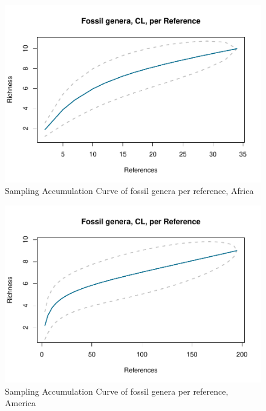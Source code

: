 \documentclass[]{article}
\begin{document}
\begin{figure}[htbp]
\centering
\includegraphics{MA_JJ_files/figure-latex/Species Accumulation Curve with Genera, Africa-1.pdf}
\caption{Sampling Accumulation Curve of fossil genera per reference,
Africa}
\end{figure}

\begin{figure}[htbp]
\centering
\includegraphics{MA_JJ_files/figure-latex/Species Accumulation Curve with Genera, America-1.pdf}
\caption{Sampling Accumulation Curve of fossil genera per reference,
America}
\end{figure}
\end{document}
